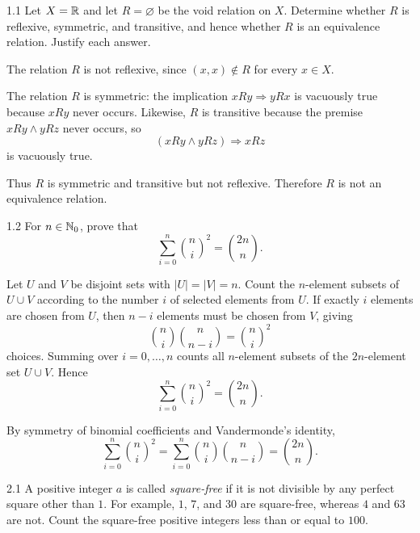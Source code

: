 \documentclass[11pt,oneside]{article}
\begin{document}

\begin{problem}{1.1}
Let $X=\mathbb{R}$ and let $R=\varnothing$ be the void relation on $X$. Determine whether $R$ is reflexive, symmetric, and transitive, and hence whether $R$ is an equivalence relation. Justify each answer.
\end{problem}

\begin{solution}
The relation $R$ is not reflexive, since $(x,x)\notin R$ for every $x\in X$.

The relation $R$ is symmetric: the implication $xRy\Rightarrow yRx$ is vacuously true because $xRy$ never occurs. Likewise, $R$ is transitive because the premise $xRy\land yRz$ never occurs, so
\[
    (xRy\land yRz)\Rightarrow xRz
\]
is vacuously true.

Thus $R$ is symmetric and transitive but not reflexive. Therefore $R$ is not an equivalence relation.
\end{solution}

\begin{problem}{1.2}
For $n\in\mathbb{N}_0$, prove that
\[
    \sum_{i=0}^{n}\binom{n}{i}^2
    =\binom{2n}{n}.
\]
\end{problem}

\begin{solution}[1]
Let $U$ and $V$ be disjoint sets with $|U|=|V|=n$. Count the $n$-element subsets of $U\cup V$ according to the number $i$ of selected elements from $U$. If exactly $i$ elements are chosen from $U$, then $n-i$ elements must be chosen from $V$, giving
\[
    \binom{n}{i}\binom{n}{n-i}
    =\binom{n}{i}^2
\]
choices. Summing over $i=0,\ldots,n$ counts all $n$-element subsets of the $2n$-element set $U\cup V$. Hence
\[
    \sum_{i=0}^{n}\binom{n}{i}^2
    =\binom{2n}{n}.
\]
\end{solution}

\begin{solution}[2]
By symmetry of binomial coefficients and Vandermonde's identity,
\[
    \sum_{i=0}^{n}\binom{n}{i}^2
    =\sum_{i=0}^{n}\binom{n}{i}\binom{n}{n-i}
    =\binom{2n}{n}.
\]
\end{solution}

\begin{problem}{2.1}
A positive integer $a$ is called \emph{square-free} if it is not divisible by any perfect square other than $1$. For example, $1$, $7$, and $30$ are square-free, whereas $4$ and $63$ are not. Count the square-free positive integers less than or equal to $100$.
\end{problem}
\end{document}
